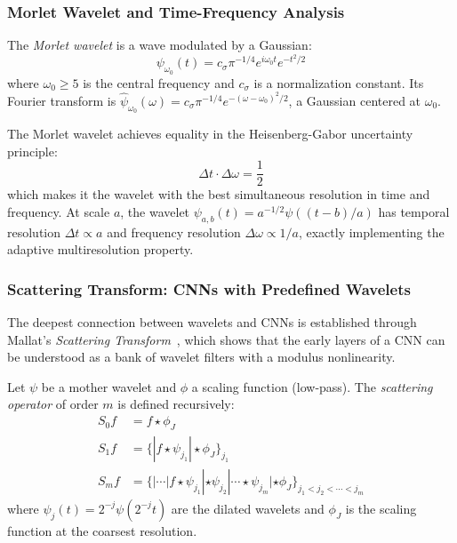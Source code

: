 \subsubsection{Morlet Wavelet and Time-Frequency Analysis}

\begin{definition}\label{def:wavelet_morlet}
The \textit{Morlet wavelet} is a wave modulated by a Gaussian:
\begin{equation}
\psi_{\omega_0}(t) = c_\sigma \pi^{-1/4} e^{i\omega_0 t} e^{-t^2/2}
\end{equation}
where $\omega_0 \geq 5$ is the central frequency and $c_\sigma$ is a normalization constant. Its Fourier transform is $\hat{\psi}_{\omega_0}(\omega) = c_\sigma \pi^{-1/4} e^{-(\omega - \omega_0)^2/2}$, a Gaussian centered at $\omega_0$.
\end{definition}

\begin{remark}
The Morlet wavelet achieves equality in the Heisenberg-Gabor uncertainty principle:
\[
\Delta t \cdot \Delta \omega = \frac{1}{2}
\]
which makes it the wavelet with the best simultaneous resolution in time and frequency. At scale $a$, the wavelet $\psi_{a,b}(t) = a^{-1/2}\psi((t-b)/a)$ has temporal resolution $\Delta t \propto a$ and frequency resolution $\Delta \omega \propto 1/a$, exactly implementing the adaptive multiresolution property.
\end{remark}

\subsubsection{Scattering Transform: CNNs with Predefined Wavelets}

The deepest connection between wavelets and CNNs is established through Mallat's \textit{Scattering Transform}~\citep{Mallat2012scattering}, which shows that the early layers of a CNN can be understood as a bank of wavelet filters with a modulus nonlinearity.

\begin{definition}\label{def:scattering_transform}
Let $\psi$ be a mother wavelet and $\phi$ a scaling function (low-pass). The \textit{scattering operator} of order $m$ is defined recursively:
\begin{align}
S_0 f &= f \star \phi_J \\
S_1 f &= \{|f \star \psi_{j_1}| \star \phi_J\}_{j_1} \\
S_m f &= \{|\cdots|f \star \psi_{j_1}| \star \psi_{j_2}| \cdots \star \psi_{j_m}| \star \phi_J\}_{j_1 < j_2 < \cdots < j_m}
\end{align}
where $\psi_j(t) = 2^{-j}\psi(2^{-j}t)$ are the dilated wavelets and $\phi_J$ is the scaling function at the coarsest resolution.
\end{definition}

